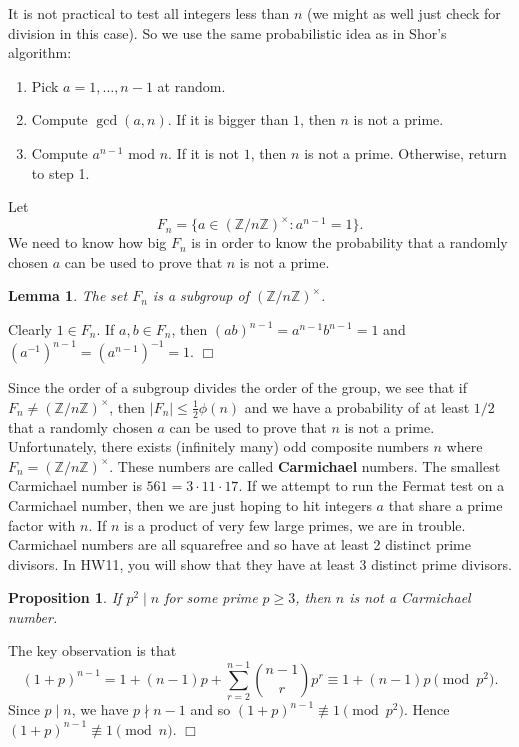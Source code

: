 \documentclass{article}
\def\Z{{\mathbb Z}}
\def\Z{{\mathbb Z}}
\newtheorem{lemma}[subsection]{Lemma}
\newtheorem{proposition}[subsection]{Proposition}
\newenvironment{proof}{\noindent {\bf Proof:}}{$\Box$ \vspace{2 ex}}
\begin{document}
It is not practical to test all integers less than $n$ (we might as well just check for division in this case). So we use the same probabilistic idea as in Shor's algorithm: 
\begin{enumerate}
    \item Pick $a = 1,\ldots,n-1$ at random.
    \item Compute $\gcd(a,n)$. If it is bigger than $1$, then $n$ is not a prime.
    \item Compute $a^{n-1}$ mod $n$. If it is not $1$, then $n$ is not a prime. Otherwise, return to step 1.
\end{enumerate}
Let $$F_n = \{a\in (\Z/n\Z)^\times \colon a^{n-1} = 1\}.$$
We need to know how big $F_n$ is in order to know the probability that a randomly chosen $a$ can be used to prove that $n$ is not a prime.

\begin{lemma}
    The set $F_n$ is a subgroup of $(\Z/n\Z)^\times$.
\end{lemma}

\begin{proof}
    Clearly $1\in F_n$. If $a,b\in F_n$, then $(ab)^{n-1} = a^{n-1}b^{n-1} = 1$ and $(a^{-1})^{n-1} = (a^{n-1})^{-1} = 1$. 
\end{proof}

Since the order of a subgroup divides the order of the group, we see that if $F_n\neq(\Z/n\Z)^\times$, then $|F_n| \leq \frac12\phi(n)$ and we have a probability of at least $1/2$ that a randomly chosen $a$ can be used to prove that $n$ is not a prime. Unfortunately, there exists (infinitely many) odd composite numbers $n$ where $F_n = (\Z/n\Z)^\times$. These numbers are called \textbf{Carmichael} numbers. The smallest Carmichael number is $561 = 3\cdot 11\cdot 17.$ If we attempt to run the Fermat test on a Carmichael number, then we are just hoping to hit integers $a$ that share a prime factor with $n$. If $n$ is a product of very few large primes, we are in trouble. Carmichael numbers are all squarefree and so have at least 2 distinct prime divisors. In HW11, you will show that they have at least 3 distinct prime divisors.

\begin{proposition}
    If $p^2\mid n$ for some prime $p\geq 3$, then $n$ is not a Carmichael number.
\end{proposition}

\begin{proof}
    The key observation is that $$(1 + p)^{n-1} = 1 + (n-1)p + \sum_{r=2}^{n-1}\binom{n-1}{r}p^r\equiv 1 + (n-1)p\pmod{p^2}.$$
    Since $p\mid n$, we have $p\nmid n-1$ and so $(1+p)^{n-1}\not\equiv 1\pmod{p^2}$. Hence $(1+p)^{n-1}\not\equiv 1\pmod{n}$.
\end{proof}
\end{document}
